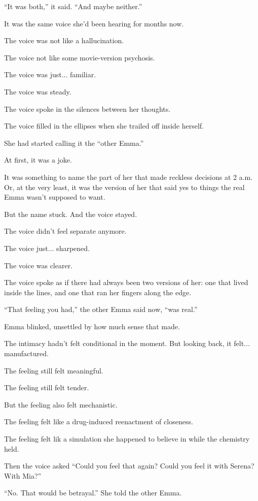 ``It was both,'' it said. ``And maybe neither.''

It was the same voice she’d been hearing for months now.

The voice was not like a hallucination.

The voice not like some movie-version psychosis. 

The voice was just... familiar. 

The voice was steady. 

The voice spoke in the silences between her thoughts. 

The voice filled in the ellipses when she trailed off inside herself.

She had started calling it the ``other Emma.''

At first, it was a joke. 

It was something to name the part of her that made reckless decisions at 2 a.m.  
Or, at the very least, it was the version of her that said yes to things the real 
Emma wasn’t supposed to want.

But the name stuck. And the voice stayed. 

The voice didn’t feel separate anymore.  

The voice just... sharpened. 

The voice was clearer. 

The voice spoke as if there had always been two versions of her: one that lived inside the lines, and one that ran her fingers along the edge.

``That feeling you had,'' the other Emma said now, ``was real.''

Emma blinked, unsettled by how much sense that made.

The intimacy hadn’t felt conditional in the moment. But looking back, it felt... manufactured. 

The feeling still felt meaningful.

The feeling still felt tender. 

But the feeling also felt mechanistic.

The feeling felt like a drug-induced reenactment of closeness. 

The feeling felt lik a simulation she happened to believe in while the chemistry held.


Then the voice asked ``Could you feel that again? Could you feel it with Serena?  With Mia?''

``No. That would be betrayal.'' She told the other Emma.

